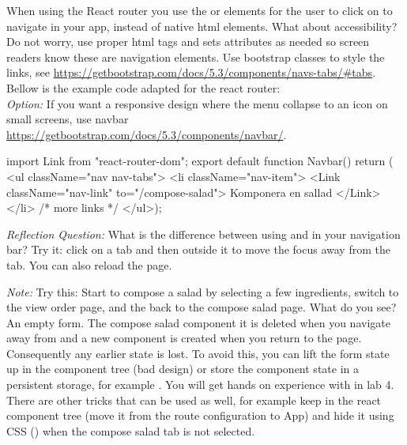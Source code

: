 \documentclass[fleqn, article, a4paper]{memoir}
\begin{document}
\begin{Assignments}
\noindent When using the React router you use the  or  elements for the user to click on to navigate in your app, instead of native  html elements. What about accessibility? Do not worry,  use proper html tags and sets  attributes as needed so screen readers know these are navigation elements. Use bootstrap classes to style the links, see \url{https://getbootstrap.com/docs/5.3/components/navs-tabs/#tabs}. Bellow is the example code adapted for the react router:
\\ \emph{Option:} If you want a responsive design where the menu collapse to an icon on small screens, use navbar \url{https://getbootstrap.com/docs/5.3/components/navbar/}.

\begin{Code}
import { Link } from "react-router-dom";
export default function Navbar() {
  return (
  <ul className="nav nav-tabs">
    <li className="nav-item">
      <Link className="nav-link" to="/compose-salad">
        Komponera en sallad
      </Link>
    </li>
    {/* more links */}
  </ul>);
}
\end{Code}

\noindent \emph{Reflection Question:} What is the difference between using  and  in your navigation bar? Try it: click on a tab and then outside it to move the focus away from the tab. You can also reload the page.

\emph{Note:} Try this: Start to compose a salad by selecting a few ingredients, switch to the view order page, and the back to the compose salad page. What do you see? An empty form. The compose salad component it is deleted when you navigate away from and a new component is created when you return to the page. Consequently any earlier state is lost. To avoid this, you can lift the form state up in the component tree (bad design) or store the component state in a persistent storage, for example . You will get hands on experience with  in lab 4. There are other tricks that can be used as well, for example keep  in the react component tree (move it from the route configuration to App) and hide it using CSS () when the compose salad tab is not selected.


\end{Assignments}
\end{document}
